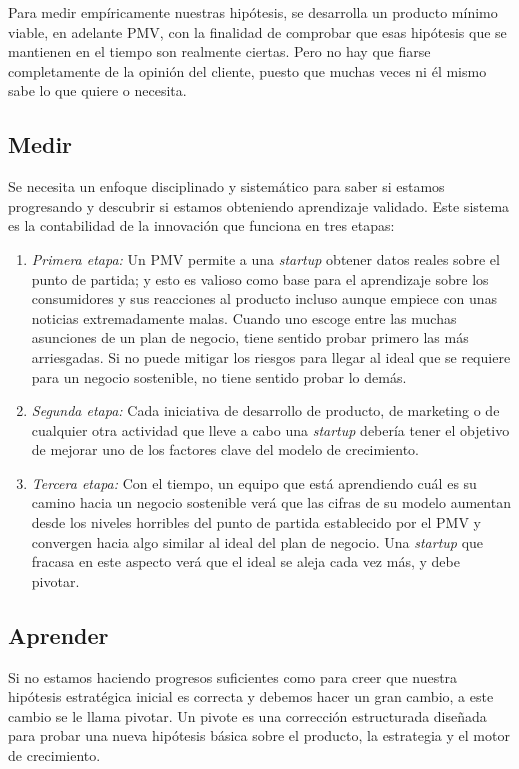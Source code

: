 Para medir empíricamente nuestras hipótesis, se desarrolla un producto mínimo viable, en adelante PMV, con la finalidad de comprobar que esas hipótesis que se mantienen en el tiempo son realmente ciertas. Pero no hay que fiarse completamente de la opinión del cliente, puesto que muchas veces ni él mismo sabe lo que quiere o necesita.


\subsection{Medir}
Se necesita un enfoque disciplinado y sistemático para saber si estamos progresando y descubrir si estamos obteniendo aprendizaje validado. Este sistema es la contabilidad de la innovación que funciona en tres etapas:
\begin{enumerate}
\item \textit{Primera etapa: } Un PMV permite a una \textit{startup} obtener datos reales sobre el punto de partida; y esto es valioso como base para el aprendizaje sobre los consumidores y sus reacciones al producto incluso aunque empiece con unas noticias extremadamente malas. Cuando uno escoge entre las muchas asunciones de un plan de negocio, tiene sentido probar primero las más arriesgadas. Si no puede mitigar los riesgos para llegar al ideal que se requiere para un negocio sostenible, no tiene sentido probar lo demás.
\item \textit{Segunda etapa: } Cada iniciativa de desarrollo de producto, de marketing o de cualquier otra actividad que lleve a cabo una \textit{startup} debería tener el objetivo de mejorar uno de los factores clave del modelo de crecimiento.
\item \textit{Tercera etapa: } Con el tiempo, un equipo que está aprendiendo cuál es su camino hacia un negocio sostenible verá que las cifras de su modelo aumentan desde los niveles horribles del punto de partida establecido por el PMV y convergen hacia algo similar al ideal del plan de negocio. Una \textit{startup} que fracasa en este aspecto verá que el ideal se aleja cada vez más, y debe pivotar.
\end{enumerate}


\subsection{Aprender}
Si no estamos haciendo progresos suficientes como para creer que nuestra hipótesis estratégica inicial es correcta y debemos hacer un gran cambio, a este cambio se le llama pivotar. Un pivote es una corrección estructurada diseñada para probar una nueva hipótesis básica sobre el producto, la estrategia y el motor de crecimiento.


